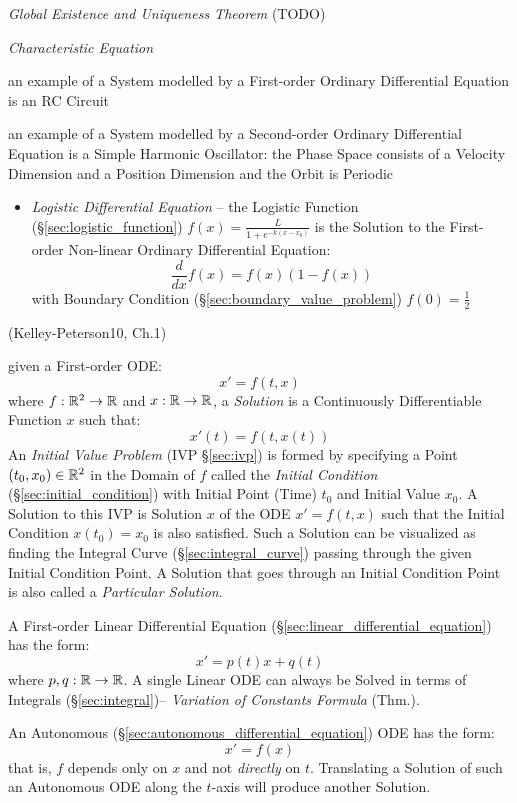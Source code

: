 \emph{Global Existence and Uniqueness Theorem} (TODO)


\emph{Characteristic Equation}

an example of a System modelled by a First-order Ordinary Differential Equation
is an RC Circuit

an example of a System modelled by a Second-order Ordinary Differential
Equation is a Simple Harmonic Oscillator: the Phase Space consists of a
Velocity Dimension and a Position Dimension and the Orbit is Periodic

\asterism

\begin{itemize}
  \item \emph{Logistic Differential Equation} -- the Logistic Function
    (\S\ref{sec:logistic_function}) $f(x) = \frac{L}{1 + e^{-k(x-x_0)}}$ is the
    Solution to the First-order Non-linear Ordinary Differential Equation:
  \[
    \frac{d}{dx}f(x) = f(x)(1 - f(x))
  \]
  with Boundary Condition (\S\ref{sec:boundary_value_problem}) $f(0) =
  \frac{1}{2}$
\end{itemize}

\asterism

(Kelley-Peterson10, Ch.1)

given a First-order ODE:
\[
  x' = f(t,x)
\]
where $f : \mathbb{R}^2 \rightarrow \mathbb{R}$ and $x : \mathbb{R} \rightarrow \mathbb{R}$, a
\emph{Solution} is a Continuously Differentiable Function $x$ such that:
\[
  x'(t) = f(t, x(t))
\]
An \emph{Initial Value Problem} (IVP \S\ref{sec:ivp}) is formed by specifying a
Point $(t_0, x_0) \in \mathbb{R}^2$ in the Domain of $f$ called the \emph{Initial
  Condition} (\S\ref{sec:initial_condition}) with Initial Point (Time) $t_0$ and
Initial Value $x_0$.
A Solution to this IVP is Solution $x$ of the ODE $x' = f(t,x)$ such that the
Initial Condition $x(t_0) = x_0$ is also satisfied. Such a Solution can be
visualized as finding the Integral Curve (\S\ref{sec:integral_curve}) passing
through the given Initial Condition Point.
A Solution that goes through an Initial Condition Point is also called a
\emph{Particular Solution}.

A First-order Linear Differential Equation
(\S\ref{sec:linear_differential_equation}) has the form:
\[
  x' = p(t)x + q(t)
\]
where $p, q: \mathbb{R} \rightarrow \mathbb{R}$.
A single Linear ODE can always be Solved in terms of Integrals
(\S\ref{sec:integral})-- \emph{Variation of Constants Formula} (Thm.).

An Autonomous (\S\ref{sec:autonomous_differential_equation}) ODE has the form:
\[
  x' = f(x)
\]
that is, $f$ depends only on $x$ and not \emph{directly} on $t$. Translating a
Solution of such an Autonomous ODE along the $t$-axis will produce another
Solution.



